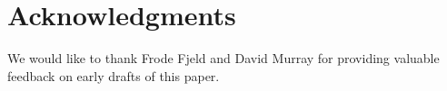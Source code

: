 \section{Acknowledgments} 

We would like to thank Frode Fjeld and David Murray for providing
valuable feedback on early drafts of this paper.
